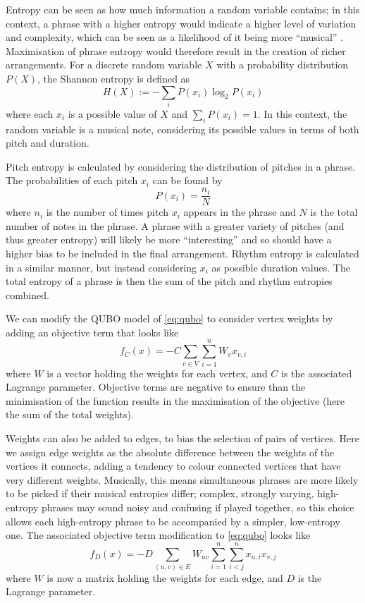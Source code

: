 \documentclass[12pt]{article}
\theoremstyle{definition}
\begin{document}
Entropy can be seen as how much information a random variable contains; in this context, a phrase with a higher entropy would indicate a higher level of variation and complexity, which can be seen as a likelihood of it being more ``musical'' \cite{li_entropy_2019}. Maximisation of phrase entropy would therefore result in the creation of richer arrangements. For a discrete random variable $X$ with a probability distribution $P(X)$, the Shannon entropy is defined as
\begin{equation}
    H(X):=-\sum_i P(x_i)\log_2 P(x_i)
    \label{eq:entropy}
\end{equation}
where each $x_i$ is a possible value of $X$ and ${\sum_i P(x_i)=1}$. In this context, the random variable is a musical note, considering its possible values in terms of both pitch and duration.

Pitch entropy is calculated by considering the distribution of pitches in a phrase. The probabilities of each pitch $x_i$ can be found by
\begin{equation}
    P(x_i)=\frac{n_i}{N}
    \label{eq:prob-dist}
\end{equation}
where $n_i$ is the number of times pitch $x_i$ appears in the phrase and $N$ is the total number of notes in the phrase. A phrase with a greater variety of pitches (and thus greater entropy) will likely be more ``interesting'' and so should have a higher bias to be included in the final arrangement.
Rhythm entropy is calculated in a similar manner, but instead considering $x_i$ as possible duration values.
The total entropy of a phrase is then the sum of the pitch and rhythm entropies combined.

We can modify the QUBO model of \cref{eq:qubo} to consider vertex weights by adding an objective term that looks like
\begin{equation}
    f_C(x)=-C\sum_{v\in V}\sum_{i=1}^n W_v x_{v,i}
\end{equation}
where $W$ is a vector holding the weights for each vertex, and $C$ is the associated Lagrange parameter. Objective terms are negative to ensure than the minimisation of the function results in the maximisation of the objective (here the sum of the total weights).

Weights can also be added to edges, to bias the selection of pairs of vertices. Here we assign edge weights as the absolute difference between the weights of the vertices it connects, adding a tendency to colour connected vertices that have very different weights. Musically, this means simultaneous phrases are more likely to be picked if their musical entropies differ; complex, strongly varying, high-entropy phrases may sound noisy and confusing if played together, so this choice allows each high-entropy phrase to be accompanied by a simpler, low-entropy one. The associated objective term modification to \cref{eq:qubo} looks like
\begin{equation}
    f_D(x)=-D\sum_{(u,v)\in E}W_{uv}\sum_{i=1}^n\sum_{i<j}^n x_{u,i}x_{v,j}
\end{equation}
where $W$ is now a matrix holding the weights for each edge, and $D$ is the Lagrange parameter.
\end{document}
